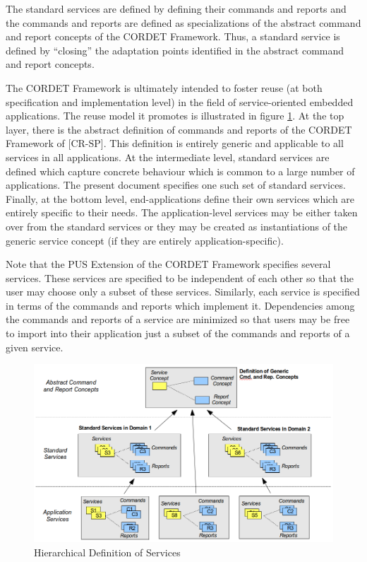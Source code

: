 \documentclass[a4paper,10pt]{article}
\begin{document}
The standard services are defined by defining their commands and reports and the commands and reports are defined as specializations of the abstract command and report concepts of the CORDET Framework. Thus, a standard service is defined by “closing” the adaptation points identified in the abstract command and report concepts.

The CORDET Framework is ultimately intended to foster reuse (at both specification and implementation level) in the field of service-oriented embedded applications. The reuse model it promotes is illustrated in figure \ref{fig:HierarchicalDefServ}. At the top layer, there is the abstract definition of commands and reports of the CORDET Framework of [CR-SP]. This definition is entirely generic and applicable to all services in all applications. At the intermediate level, standard services are defined which capture concrete behaviour which is common to a large number of applications. The present document specifies one such set of standard services. Finally, at the bottom level, end-applications define their own services which are entirely specific to their needs. The application-level services may be either taken over from the standard services or they may be created as instantiations of the generic service concept (if they are entirely application-specific).

Note that the PUS Extension of the CORDET Framework specifies several services. These services are specified to be independent of each other so that the user may choose only a subset of these services. Similarly, each service is specified in terms of the commands and reports which implement it. Dependencies among the commands and reports of a service are minimized so that users may be free to import into their application just a subset of the commands and reports of a given service.

\begin{figure}[ht]
 \centering
 \includegraphics[scale=0.3,keepaspectratio=true]{HierarchicalDefServ.png}
 \caption{Hierarchical Definition of Services}
 \label{fig:HierarchicalDefServ}
\end{figure}
\end{document}
